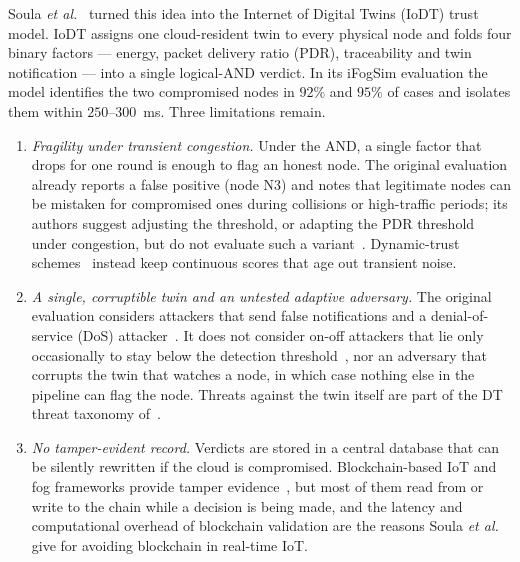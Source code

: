 \documentclass[lineno,pdflatex,sn-nature]{sn-jnl}
\theoremstyle{thmstyleone}%
\theoremstyle{thmstylethree}%
\begin{document}
Soula \textit{et al.}~\cite{soula2024iodt} turned this idea into the
Internet of Digital Twins (IoDT) trust model.  IoDT assigns one
cloud-resident twin to every physical node and folds four binary
factors --- energy, packet delivery ratio (PDR), traceability and twin
notification --- into a single logical-AND verdict.  In its iFogSim
evaluation the model identifies the two compromised nodes in $92\%$
and $95\%$ of cases and isolates them within $250$--$300$~ms.  Three
limitations remain.

\begin{enumerate}
\item \emph{Fragility under transient congestion.}  Under the AND, a
single factor that drops for one round is enough to flag an honest
node.  The original evaluation already reports a false positive
(node N3) and notes that legitimate nodes can be mistaken for
compromised ones during collisions or high-traffic periods; its
authors suggest adjusting the threshold, or adapting the PDR
threshold under congestion, but do not evaluate such a variant~\cite{soula2024iodt}.
Dynamic-trust schemes~\cite{bao2012dynamic,nitti2014trustworthiness}
instead keep continuous scores that age out transient noise.

\item \emph{A single, corruptible twin and an untested adaptive
adversary.}  The original evaluation considers attackers that send
false notifications and a denial-of-service (DoS) attacker~\cite{soula2024iodt}.
It does not consider on-off attackers that lie only occasionally to
stay below the detection threshold~\cite{sun2006trust},
nor an adversary that corrupts the twin that watches a node, in which
case nothing else in the pipeline can flag the node.  Threats against
the twin itself are part of the DT threat taxonomy
of~\cite{alcaraz2022digital}.

\item \emph{No tamper-evident record.}  Verdicts are stored in a
central database that can be silently rewritten if the cloud is
compromised.  Blockchain-based IoT and fog frameworks provide tamper
evidence~\cite{dorri2017blockchain,novo2018blockchain,kumar2020blockedge,%
dewanta2021bpt,akram2024tmiodt}, but most of them read from or write
to the chain while a decision is being made, and the latency and
computational overhead of blockchain validation are the reasons Soula
\textit{et al.}~\cite{soula2024iodt} give for avoiding blockchain in
real-time IoT.
\end{enumerate}
\end{document}
